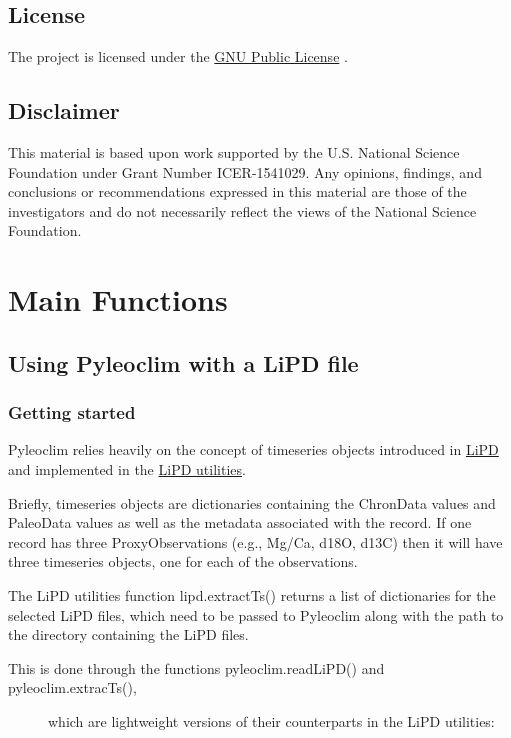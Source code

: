 \documentclass[letterpaper,10pt,english]{sphinxmanual}
\begin{document}
\section{License}
\label{\detokenize{Introduction:license}}
The project is licensed under the \href{https://github.com/LinkedEarth/Pyleoclim\_util/blob/master/license}{GNU Public License} .


\section{Disclaimer}
\label{\detokenize{Introduction:disclaimer}}
This material is based upon work supported by the U.S. National Science Foundation under Grant Number
ICER-1541029. Any opinions, findings, and conclusions or recommendations expressed in this material are those
of the investigators and do not necessarily reflect the views of the National Science Foundation.


\chapter{Main Functions}
\label{\detokenize{Main:main-functions}}\label{\detokenize{Main::doc}}

\section{Using Pyleoclim with a LiPD file}
\label{\detokenize{Main:using-pyleoclim-with-a-lipd-file}}

\subsection{Getting started}
\label{\detokenize{Main:getting-started}}
Pyleoclim relies heavily on the concept of timeseries objects introduced in
\href{http://www.clim-past.net/12/1093/2016/}{LiPD} and implemented in the
\href{http://nickmckay.github.io/LiPD-utilities/}{LiPD utilities}.

Briefly, timeseries objects are dictionaries containing the ChronData values and
PaleoData values as well as the metadata associated with the record. If one record
has three ProxyObservations (e.g., Mg/Ca, d18O, d13C) then it will have three timeseries
objects, one for each of the observations.

The LiPD utilities function lipd.extractTs() returns a list of dictionaries for
the selected LiPD files, which need to be passed to Pyleoclim along with the path
to the directory containing the LiPD files.
\begin{description}
\item[{This is done through the functions pyleoclim.readLiPD() and pyleoclim.extracTs(),}] \leavevmode
which are lightweight versions of their counterparts in the LiPD utilities:

\end{description}
\end{document}
